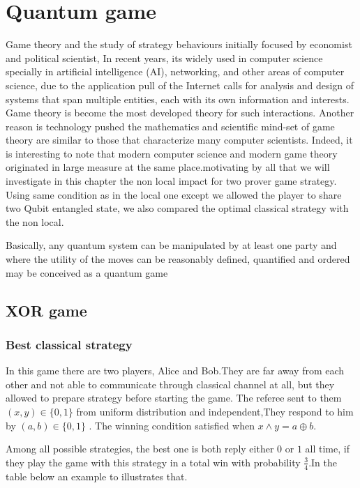 \chapter{Quantum game}\hfill \break
Game theory  and  the study of strategy behaviours initially focused by economist and political scientist, In recent years, its widely used in computer science specially in artificial intelligence (AI), networking, and other areas of computer science, due to  the application pull of the Internet calls for analysis and design of systems that span multiple entities, each with its own information and interests. Game theory is become the most developed theory for such interactions. Another reason is technology pushed the mathematics and scientific mind-set of game theory are similar to those that characterize many computer scientists. Indeed, it is interesting to note that modern computer science and modern game theory originated in large measure at the same place.motivating by all that we will investigate in this chapter  the non local impact  for two prover game strategy.
Using same condition as in the local one except we allowed the player  to share two Qubit entangled  state, we also compared  the optimal classical strategy with the non local.

Basically, any quantum system can be manipulated by at least one party and where the utility of the moves can be reasonably defined, quantified and ordered may be conceived as a quantum game

\section{XOR game}
\subsection{Best classical strategy}\hfill \break
In this game there are  two players, Alice and Bob.They are far away from each other and not able to communicate through classical channel at all, but they allowed to prepare strategy  before starting the game. The referee sent to them    $(x,y)\in \{0,1\}$  from uniform distribution and independent\citep*{PhysRevA.93.022333},They respond  to him by $(a,b)\in \{0,1\}$ .  The   winning  condition  satisfied when $x\wedge y= a\oplus b$.

Among all possible strategies, the best one is both reply either $0$ or $1$ all time, if they play the game with this strategy in a total win with probability $\frac{3}{4}$.In the table below an example to illustrates that.

